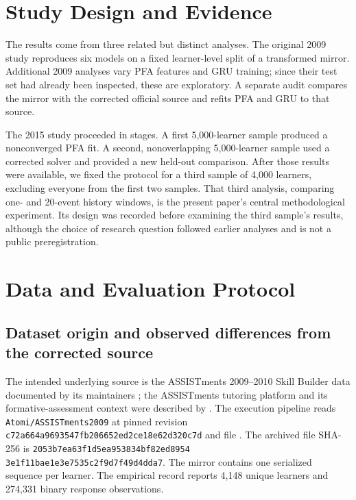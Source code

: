 \documentclass[11pt,a4paper]{article}
\begin{document}
\section{Study Design and Evidence}
The results come from three related but distinct analyses. The original 2009 study reproduces six models on a fixed learner-level split of a transformed mirror. Additional 2009 analyses vary PFA features and GRU training; since their test set had already been inspected, these are exploratory. A separate audit compares the mirror with the corrected official source and refits PFA and GRU to that source.

The 2015 study proceeded in stages. A first 5,000-learner sample produced a nonconverged PFA fit. A second, nonoverlapping 5,000-learner sample used a corrected solver and provided a new held-out comparison. After those results were available, we fixed the protocol for a third sample of 4,000 learners, excluding everyone from the first two samples. That third analysis, comparing one- and 20-event history windows, is the present paper's central methodological experiment. Its design was recorded before examining the third sample's results, although the choice of research question followed earlier analyses and is not a public preregistration.

\section{Data and Evaluation Protocol}
\subsection{Dataset origin and observed differences from the corrected source}
The intended underlying source is the ASSISTments 2009--2010 Skill Builder data documented by its maintainers \citep{assistmentsdata}; the ASSISTments tutoring platform and its formative-assessment context were described by \citet{feng2009}. The execution pipeline reads \texttt{Atomi/ASSISTments2009} at pinned revision \texttt{c72a664a9693547fb206652}\allowbreak\texttt{ed2ce18e62d320c7d} and file . The archived file SHA-256 is \texttt{2053b7ea63f1d5ea953834bf82ed8954}\\\texttt{3e1f11bae1e3e7535c2f9d7f49d4dda7}. The mirror contains one serialized sequence per learner. The empirical record reports 4,148 unique learners and 274,331 binary response observations.
\end{document}
